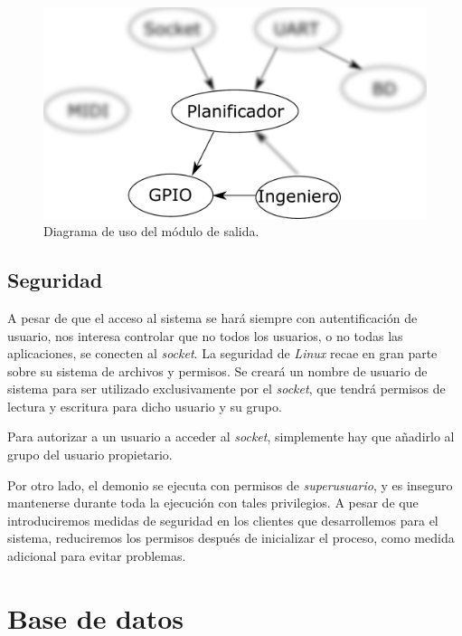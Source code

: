 \begin{figure}[H]
	\noindent \begin{centering}
		\includegraphics[width=\linewidth/2]{capitulo4/daemon_gpio}
		\par\end{centering}
	\smallskip
	\caption{\label{fig:daemon_gpio} Diagrama de uso del módulo de salida.}
\end{figure} 

\smallskip

\subsection{Seguridad}

A pesar de que el acceso al sistema se hará siempre con autentificación de usuario, nos interesa controlar que no todos los usuarios, o no todas las aplicaciones, se conecten al \textit{socket}. La seguridad de \textit{Linux} recae en gran parte sobre su sistema de archivos y permisos. Se creará un nombre de usuario de sistema para ser utilizado exclusivamente por el \textit{socket}, que tendrá permisos de lectura y escritura para dicho usuario y su grupo.

Para autorizar a un usuario a acceder al \textit{socket}, simplemente hay que añadirlo al grupo del usuario propietario.

Por otro lado, el demonio se ejecuta con permisos de \textit{superusuario}, y es inseguro mantenerse durante toda la ejecución con tales privilegios. A pesar de que introduciremos medidas de seguridad en los clientes que desarrollemos para el sistema, reduciremos los permisos después de inicializar el proceso, como medida adicional para evitar problemas.

\section{Base de datos}

